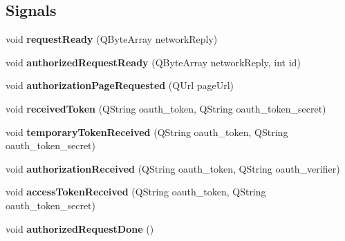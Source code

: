 \subsection*{Signals}
\begin{DoxyCompactItemize}
\item 
\mbox{\label{class_k_q_o_auth_manager_a637a90374031a674248dd2c38b56c5db}} 
void {\bfseries request\+Ready} (Q\+Byte\+Array network\+Reply)
\item 
\mbox{\label{class_k_q_o_auth_manager_a7f14d3dee2310d76f8a129eb37b1214f}} 
void {\bfseries authorized\+Request\+Ready} (Q\+Byte\+Array network\+Reply, int id)
\item 
\mbox{\label{class_k_q_o_auth_manager_a8f95a236a939a075690d32fd1be2b8cf}} 
void {\bfseries authorization\+Page\+Requested} (Q\+Url page\+Url)
\item 
\mbox{\label{class_k_q_o_auth_manager_a848468c8c53717c76f4b553620669cba}} 
void {\bfseries received\+Token} (Q\+String oauth\+\_\+token, Q\+String oauth\+\_\+token\+\_\+secret)
\item 
\mbox{\label{class_k_q_o_auth_manager_acddf279ebc3585afbed2ed8fdf3f008d}} 
void {\bfseries temporary\+Token\+Received} (Q\+String oauth\+\_\+token, Q\+String oauth\+\_\+token\+\_\+secret)
\item 
\mbox{\label{class_k_q_o_auth_manager_a31b318f4f7ec3b73785082e68be8f979}} 
void {\bfseries authorization\+Received} (Q\+String oauth\+\_\+token, Q\+String oauth\+\_\+verifier)
\item 
\mbox{\label{class_k_q_o_auth_manager_aebc8f8f6e6cb10efc7189c2273191d39}} 
void {\bfseries access\+Token\+Received} (Q\+String oauth\+\_\+token, Q\+String oauth\+\_\+token\+\_\+secret)
\item 
\mbox{\label{class_k_q_o_auth_manager_a77a72a935a30489842981b6ea21b9f5d}} 
void {\bfseries authorized\+Request\+Done} ()
\end{DoxyCompactItemize}
